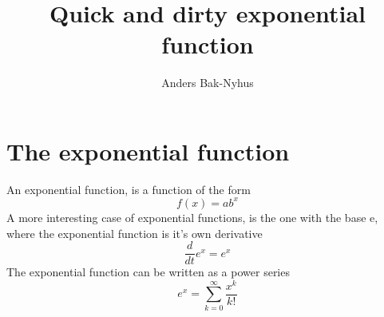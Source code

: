 \documentclass[]{article}
\title{Quick and dirty exponential function}
\author{Anders Bak-Nyhus}
\date{}
\begin{document}
\maketitle

\section*{The exponential function}
An exponential function, is a function of the form
\begin{equation}
	f(x) = ab^x
\end{equation}
A more interesting case of exponential functions, is the one with the base e, where the exponential function is it's own derivative
\begin{equation}
	\frac{d}{dt}e^x = e^x
\end{equation}
The exponential function can be written as a power series
\begin{equation}
	e^x = \sum_{k=0}^{\infty} \frac{x^k}{k!}
\end{equation}
\end{document}
